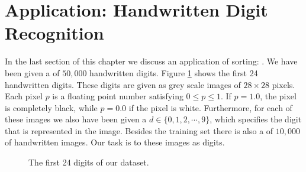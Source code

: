 \section{Application: Handwritten Digit Recognition}
In the last section of this chapter we discuss an application of sorting: .
We have been given a  of $50,000$ handwritten digits. Figure \ref{fig:digits.pdf} shows the first 24
handwritten digits.  These digits are given as grey scale images of $28 \times 28$ pixels.  Each pixel $p$ is a
floating point number satisfying $0 \leq p \leq 1$. If $p = 1.0$, the pixel is completely black, while $p = 0.0$ if the
pixel is white.  Furthermore, for each of these images we also have been given a 
$d \in \{0,1,2,\cdots,9\}$, which specifies the digit that is represented in the image.  Besides the training set 
there is also a  of $10,000$ of handwritten images.  Our task is to  these images
as digits.


\begin{figure}[!ht]
  \centering
  \caption{The first 24 digits of our dataset.}
  \label{fig:digits.pdf}
\end{figure}

